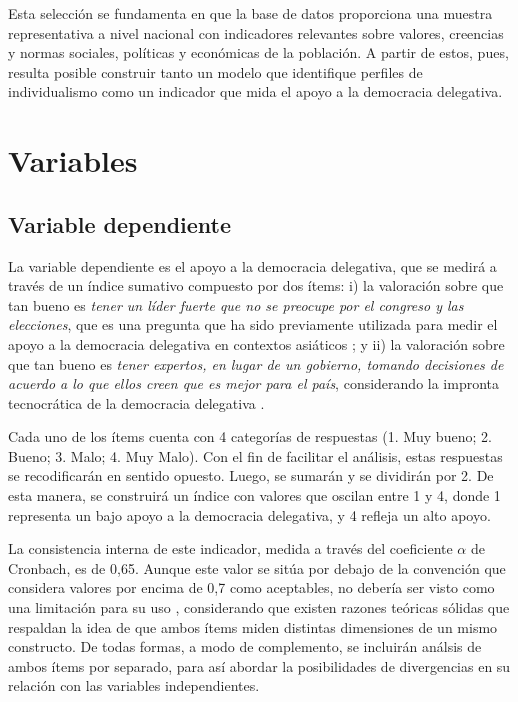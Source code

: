 \documentclass[12pt,twoside]{templates/facsothesis}
\begin{document}
\FloatBarrier

Esta selección se fundamenta en que la base de datos proporciona una muestra representativa a nivel nacional con indicadores relevantes sobre valores, creencias y normas sociales, políticas y económicas de la población. A partir de estos, pues, resulta posible construir tanto un modelo que identifique perfiles de individualismo como un indicador que mida el apoyo a la democracia delegativa.

\hypertarget{variables}{%
\section{Variables}\label{variables}}

\hypertarget{variable-dependiente}{%
\subsection{Variable dependiente}\label{variable-dependiente}}

La variable dependiente es el apoyo a la democracia delegativa, que se medirá a través de un índice sumativo compuesto por dos ítems: i) la valoración sobre que tan bueno es \emph{tener un líder fuerte que no se preocupe por el congreso y las elecciones}, que es una pregunta que ha sido previamente utilizada para medir el apoyo a la democracia delegativa en contextos asiáticos \citep{kang2018}; y ii) la valoración sobre que tan bueno es \emph{tener expertos, en lugar de un gobierno, tomando decisiones de acuerdo a lo que ellos creen que es mejor para el país}, considerando la impronta tecnocrática de la democracia delegativa \citep{odonnell1994}.

Cada uno de los ítems cuenta con 4 categorías de respuestas (1. Muy bueno; 2. Bueno; 3. Malo; 4. Muy Malo). Con el fin de facilitar el análisis, estas respuestas se recodificarán en sentido opuesto. Luego, se sumarán y se dividirán por 2. De esta manera, se construirá un índice con valores que oscilan entre 1 y 4, donde 1 representa un bajo apoyo a la democracia delegativa, y 4 refleja un alto apoyo.

La consistencia interna de este indicador, medida a través del coeficiente \(\alpha\) de Cronbach, es de 0,65. Aunque este valor se sitúa por debajo de la convención que considera valores por encima de 0,7 como aceptables, no debería ser visto como una limitación para su uso \citep{schmitt1996}, considerando que existen razones teóricas sólidas que respaldan la idea de que ambos ítems miden distintas dimensiones de un mismo constructo. De todas formas, a modo de complemento, se incluirán análsis de ambos ítems por separado, para así abordar la posibilidades de divergencias en su relación con las variables independientes.
\end{document}
